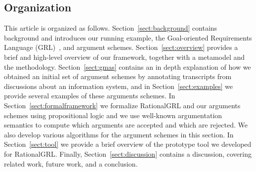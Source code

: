 \subsection{Organization}

This article is organized as follows. Section~\ref{sect:background} contains background and introduces our running example, the Goal-oriented Requirements Language (GRL)~\cite{}, and argument schemes. Section~\ref{sect:overview} provides a brief and high-level overview of our framework, together with a metamodel and the methodology. Section~\ref{sect:gmas} contains an in depth explanation of how we obtained an initial set of argument schemes by annotating transcripts from discussions about an information system, and in Section~\ref{sect:examples} we provide several examples of these arguments schemes. In Section~\ref{sect:formalframework} we formalize RationalGRL and our arguments schemes using propositional logic and we use well-known argumentation semantics to compute which arguments are accepted and which are rejected. We also develop various algorithms for the argument schemes in this section. In Section~\ref{sect:tool} we provide a brief overview of the prototype tool we developed for RationalGRL. Finally, Section~\ref{sect:discussion} contains a discussion, covering related work, future work, and a conclusion.